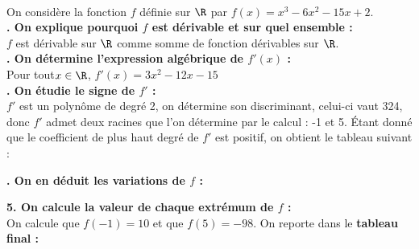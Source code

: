 \documentclass[a4paper,11pt,cours]{nsi} %
\begin{document}
\begin{methode}
	\ \\
	On considère la fonction $f$ définie sur $\R$ par $f(x)=x^3-6x^2-15x+2$.\\
	
	\textbf{. On explique pourquoi $f$ est dérivable et sur quel ensemble :}\\[.5em]	
	$f$ est dérivable sur $\R$ comme somme de fonction dérivables sur $\R$.\\
	
	\textbf{. On détermine l'expression algébrique de $f'(x)$ :}\\[.5em]
	Pour tout$ x\in\R$, $f'(x)=3x^2-12x-15$\\
	
	\textbf{. On étudie le signe de $f'$ :}\\[.5em]	
	$f'$ est un polynôme de degré 2, on détermine son discriminant, celui-ci vaut 324, donc $f'$ admet deux racines que l'on détermine par le calcul : -1 
	et 5. \'Etant donné que le coefficient de plus haut degré de $f'$ est positif, on obtient le tableau suivant :
	\begin{center}
	\end{center}
	\textbf{. On en déduit les variations de $f$ :}
	\begin{center}
	\end{center}
	{\boldmath\textbf{5. On calcule la valeur de chaque extrémum de $f$ :}}\\[.5em]	
	On calcule que $f(-1)=10$ et que $f(5)=-98$. On reporte dans le \textbf{tableau final :}
	\begin{center}
	\end{center}
	

\end{methode}
\end{document}
